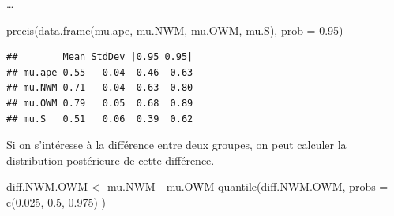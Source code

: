 \documentclass[
  a4paper,11pt,twoside,onecolumn,openright,final,oldfontcommands]{memoir}
\newenvironment{Shaded}{\begin{snugshade}}{\end{snugshade}}
\newcommand{\AttributeTok}[1]{\textcolor[rgb]{0.77,0.63,0.00}{#1}}
\newcommand{\CommentTok}[1]{\textcolor[rgb]{0.56,0.35,0.01}{\textit{#1}}}
\newcommand{\FloatTok}[1]{\textcolor[rgb]{0.00,0.00,0.81}{#1}}
\newcommand{\FunctionTok}[1]{\textcolor[rgb]{0.00,0.00,0.00}{#1}}
\newcommand{\NormalTok}[1]{#1}
\newcommand{\OtherTok}[1]{\textcolor[rgb]{0.56,0.35,0.01}{#1}}
\newcommand{\SpecialCharTok}[1]{\textcolor[rgb]{0.00,0.00,0.00}{#1}}
\theoremstyle{definition}
\theoremstyle{definition}
\theoremstyle{definition}
\theoremstyle{remark}
\begin{document}
\ldots{}

\begin{Shaded}
\end{Shaded}

\begin{Shaded}
\begin{Highlighting}[]
\FunctionTok{precis}\NormalTok{(}\FunctionTok{data.frame}\NormalTok{(mu.ape, mu.NWM, mu.OWM, mu.S), }\AttributeTok{prob =} \FloatTok{0.95}\NormalTok{)}
\end{Highlighting}
\end{Shaded}

\begin{verbatim}
##        Mean StdDev |0.95 0.95|
## mu.ape 0.55   0.04  0.46  0.63
## mu.NWM 0.71   0.04  0.63  0.80
## mu.OWM 0.79   0.05  0.68  0.89
## mu.S   0.51   0.06  0.39  0.62
\end{verbatim}

Si on s'intéresse à la différence entre deux groupes, on peut calculer la distribution postérieure de cette différence.

\begin{Shaded}
\begin{Highlighting}[]
\NormalTok{diff.NWM.OWM }\OtherTok{\textless{}{-}}\NormalTok{ mu.NWM }\SpecialCharTok{{-}}\NormalTok{ mu.OWM}
\FunctionTok{quantile}\NormalTok{(diff.NWM.OWM, }\AttributeTok{probs =} \FunctionTok{c}\NormalTok{(}\FloatTok{0.025}\NormalTok{, }\FloatTok{0.5}\NormalTok{, }\FloatTok{0.975}\NormalTok{) )}
\end{Highlighting}
\end{Shaded}
\end{document}
